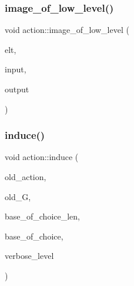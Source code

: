 \mbox{\label{classaction_ad50191dc34248d17cafd01d7b9c19a70}} 
\subsubsection{\texorpdfstring{image\+\_\+of\+\_\+low\+\_\+level()}{image\_of\_low\_level()}}
{\footnotesize\ttfamily void action\+::image\+\_\+of\+\_\+low\+\_\+level (\begin{DoxyParamCaption}\item[{void $\ast$}]{elt,  }\item[{\mbox{\hyperlink{galois_8h_a09fddde158a3a20bd2dcadb609de11dc}{I\+NT}} $\ast$}]{input,  }\item[{\mbox{\hyperlink{galois_8h_a09fddde158a3a20bd2dcadb609de11dc}{I\+NT}} $\ast$}]{output }\end{DoxyParamCaption})}

\mbox{\label{classaction_a32012836490e544a15fb4596b90cb07b}} 
\subsubsection{\texorpdfstring{induce()}{induce()}}
{\footnotesize\ttfamily void action\+::induce (\begin{DoxyParamCaption}\item[{\mbox{\hyperlink{classaction}{action}} $\ast$}]{old\+\_\+action,  }\item[{\mbox{\hyperlink{classsims}{sims}} $\ast$}]{old\+\_\+G,  }\item[{\mbox{\hyperlink{galois_8h_a09fddde158a3a20bd2dcadb609de11dc}{I\+NT}}}]{base\+\_\+of\+\_\+choice\+\_\+len,  }\item[{\mbox{\hyperlink{galois_8h_a09fddde158a3a20bd2dcadb609de11dc}{I\+NT}} $\ast$}]{base\+\_\+of\+\_\+choice,  }\item[{\mbox{\hyperlink{galois_8h_a09fddde158a3a20bd2dcadb609de11dc}{I\+NT}}}]{verbose\+\_\+level }\end{DoxyParamCaption})}

\mbox{\label{classaction_a45fb7703c6acac791acdcde339d21cc2}} 
